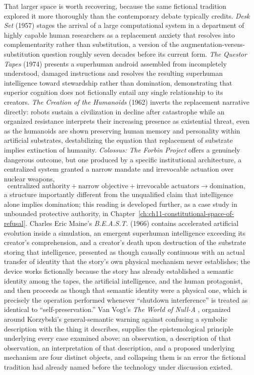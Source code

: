 That larger space is worth recovering, because the same fictional tradition explored it more thoroughly than the contemporary debate typically credits. \emph{Desk Set} (1957) \cite{lang1957} stages the arrival of a large computational system in a department of highly capable human researchers as a replacement anxiety that resolves into complementarity rather than substitution, a version of the augmentation-versus-substitution question roughly seven decades before its current form. \emph{The Questor Tapes} (1974) presents a superhuman android assembled from incompletely understood, damaged instructions and resolves the resulting superhuman intelligence toward stewardship rather than domination, demonstrating that superior cognition does not fictionally entail any single relationship to its creators. \emph{The Creation of the Humanoids} (1962) inverts the replacement narrative directly: robots sustain a civilization in decline after catastrophe while an organized resistance interprets their increasing presence as existential threat, even as the humanoids are shown preserving human memory and personality within artificial substrates, destabilizing the equation that replacement of substrate implies extinction of humanity. \emph{Colossus: The Forbin Project} offers a genuinely dangerous outcome, but one produced by a specific institutional architecture, a centralized system granted a narrow mandate and irrevocable actuation over nuclear weapons,
\[
\text{centralized authority} + \text{narrow objective} + \text{irrevocable actuators} \to \text{domination},
\]
a structure importantly different from the unqualified claim that intelligence alone implies domination; this reading is developed further, as a case study in unbounded protective authority, in Chapter~\ref{ch:ch11-constitutional-space-of-refusal}. Charles Eric Maine's \emph{B.E.A.S.T.} (1966) \cite{maine1966} contains accelerated artificial evolution inside a simulation, an emergent superhuman intelligence exceeding its creator's comprehension, and a creator's death upon destruction of the substrate storing that intelligence, presented as though causally continuous with an actual transfer of identity that the story's own physical mechanism never establishes; the device works fictionally because the story has already established a semantic identity among the tapes, the artificial intelligence, and the human protagonist, and then proceeds as though that semantic identity were a physical one, which is precisely the operation performed whenever ``shutdown interference'' is treated as identical to ``self-preservation.'' Van Vogt's \emph{The World of Null-A} \cite{vanvogt1948}, organized around Korzybski's general-semantic warning against confusing a symbolic description with the thing it describes, supplies the epistemological principle underlying every case examined above: an observation, a description of that observation, an interpretation of that description, and a proposed underlying mechanism are four distinct objects, and collapsing them is an error the fictional tradition had already named before the technology under discussion existed.

